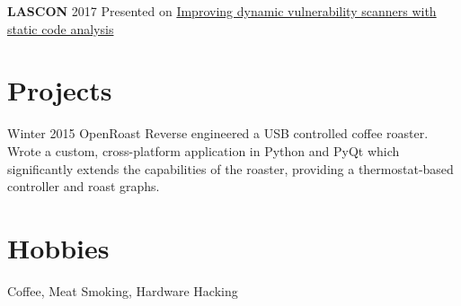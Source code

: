 \documentclass[]{CalebCoffie-CV-Class} %
\begin{document}
\textbf{LASCON} 2017 Presented on \href{http://sched.co/C1HZ}{Improving dynamic vulnerability scanners with static code analysis}




\section{Projects}

\begin{entrylist}
\entry
{Winter 2015}
{OpenRoast}
{}
{Reverse engineered a USB controlled coffee roaster. Wrote a custom, cross-platform application in Python and PyQt which significantly extends the capabilities of the roaster, providing a thermostat-based controller and roast graphs.}
\end{entrylist}


\section{Hobbies}

Coffee, Meat Smoking, Hardware Hacking
\end{document}
